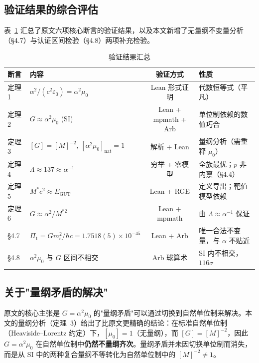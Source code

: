 \documentclass[12pt,a4paper]{article}
\begin{document}
\subsection{验证结果的综合评估}

表~\ref{tab:summary} 汇总了原文六项核心断言的验证结果，以及本文新增了无量纲不变量分析（§4.7）与认证区间检验（§4.8）两项补充检验。

\begin{table}[h]
\centering
\caption{验证结果汇总}
\label{tab:summary}
\footnotesize
\setlength{\tabcolsep}{2pt}
\begin{tabular}{@{}llcl@{}}
\toprule
\textbf{断言} & \textbf{内容} & \textbf{验证方式} & \textbf{性质} \\
\midrule
定理 1 & $\alpha^2/(c^2\varepsilon_0) = \alpha^2\mu_0$ & Lean 形式证明 & 代数恒等式（平凡） \\
定理 2 & $G \approx \alpha^2\mu_0$ (SI) & Lean + mpmath + Arb & 单位制依赖的数值巧合 \\
定理 3 & $[G] = [M]^{-2}$, $[\alpha^2\mu_0]_{\text{nat}} = 1$ & 解析 + Lean & 量纲分析（需重释 $\mu_0$） \\
定理 4 & $\Lambda \approx 137 \approx \alpha^{-1}$ & 穷举 + 零模型 & 全族最优；$p$ 非内禀（§4.4） \\
定理 5 & $M^*c^2 \approx E_\text{GUT}$ & Lean + RGE & 定义导出；靶值模型依赖 \\
定理 6 & $G \approx \alpha^2/M^{*2}$ & Lean + mpmath & 由 $\Lambda \approx \alpha^{-1}$ 保证 \\
§4.7 & $\Pi_1 = Gm_e^2/\hbar c = 1.7518(5)\times10^{-45}$ & Lean + Arb & 唯一合法不变量，与 $\alpha$ 不贴近 \\
§4.8 & $\alpha^2\mu_0$ 与 $G$ 区间不相交 & Arb 球算术 & SI 内不相交，$116\sigma$ \\
\bottomrule
\end{tabular}
\end{table}

\subsection{关于"量纲矛盾的解决"}

原文的核心主张是 $G = \alpha^2\mu_0$ 的"量纲矛盾"可以通过切换到自然单位制来解决。本文的量纲分析（定理~3）给出了比原文更精确的结论：在标准自然单位制（Heaviside--Lorentz 约定）下，$[\mu_0] = 1$（无量纲），而 $[G] = [M]^{-2}$，因此 $G = \alpha^2\mu_0$ 在自然单位制中\textbf{仍然不量纲齐次}。量纲矛盾并未因切换单位制而消失，而是从 SI 中的两种复合量纲不等转化为自然单位制中的 $[M]^{-2} \neq 1$。
\end{document}
